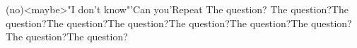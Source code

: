 \documentclass{article}
\begin{document}
\begin{test}[yes](no)<maybe>"I don't know"'Can you'{Repeat}
	The question? The question?The question?The question?The question?The question?The question?The question?The question?The question?
\end{test}
\end{document}
